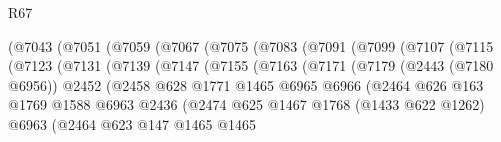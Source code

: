 \begin{lexlean}{R67}
\begin{coremodule}
                      (@7043
                        (@7051
                          (@7059
                            (@7067
                              (@7075
                                (@7083
                                  (@7091
                                    (@7099
                                      (@7107
                                        (@7115
                                          (@7123
                                            (@7131
                                              (@7139
                                                (@7147
                                                  (@7155
                                                    (@7163
                                                      (@7171
                                                        (@7179
                                                          (@2443 (@7180 @6956))
                                                          @2452
                                                          (@2458
                                                            @628
                                                            @1771
                                                            @1465
                                                            @6965
                                                            @6966
                                                            (@2464
                                                              @626
                                                              @163
                                                              @1769
                                                              @1588
                                                              @6963
                                                              @2436
                                                              (@2474
                                                                @625
                                                                @1467
                                                                @1768
                                                                (@1433 @622 @1262)
                                                                @6963
                                                                (@2464
                                                                  @623
                                                                  @147
                                                                  @1465
                                                                  @1465

\end{coremodule}
\end{lexlean}
